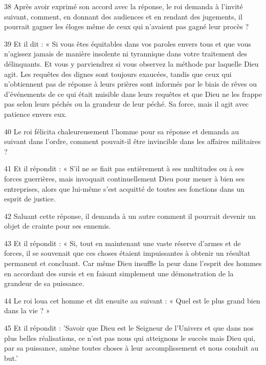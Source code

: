 \par 38 Après avoir exprimé son accord avec la réponse, le roi demanda à l'invité suivant, comment, en donnant des audiences et en rendant des jugements, il pourrait gagner les éloges même de ceux qui n'avaient pas gagné leur procès ?

\par 39 Et il dit : « Si vous êtes équitables dans vos paroles envers tous et que vous n'agissez jamais de manière insolente ni tyrannique dans votre traitement des délinquants. Et vous y parviendrez si vous observez la méthode par laquelle Dieu agit. Les requêtes des dignes sont toujours exaucées, tandis que ceux qui n'obtiennent pas de réponse à leurs prières sont informés par le biais de rêves ou d'événements de ce qui était nuisible dans leurs requêtes et que Dieu ne les frappe pas selon leurs péchés ou la grandeur de leur péché. Sa force, mais il agit avec patience envers eux.

\par 40 Le roi félicita chaleureusement l'homme pour sa réponse et demanda au suivant dans l'ordre, comment pouvait-il être invincible dans les affaires militaires ?

\par 41 Et il répondit : « S’il ne se fiait pas entièrement à ses multitudes ou à ses forces guerrières, mais invoquait continuellement Dieu pour mener à bien ses entreprises, alors que lui-même s’est acquitté de toutes ses fonctions dans un esprit de justice.

\par 42 Saluant cette réponse, il demanda à un autre comment il pourrait devenir un objet de crainte pour ses ennemis.

\par 43 Et il répondit : « Si, tout en maintenant une vaste réserve d'armes et de forces, il se souvenait que ces choses étaient impuissantes à obtenir un résultat permanent et concluant. Car même Dieu insuffle la peur dans l'esprit des hommes en accordant des sursis et en faisant simplement une démonstration de la grandeur de sa puissance.

\par 44 Le roi loua cet homme et dit ensuite au suivant : « Quel est le plus grand bien dans la vie ? »

\par 45 Et il répondit : 'Savoir que Dieu est le Seigneur de l'Univers et que dans nos plus belles réalisations, ce n'est pas nous qui atteignons le succès mais Dieu qui, par sa puissance, amène toutes choses à leur accomplissement et nous conduit au but.'

